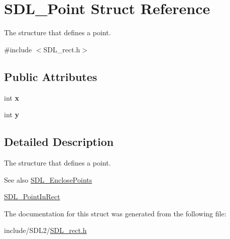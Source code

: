 \hypertarget{struct_s_d_l___point}{}\section{S\+D\+L\+\_\+\+Point Struct Reference}
\label{struct_s_d_l___point}


The structure that defines a point.  




{\ttfamily \#include $<$S\+D\+L\+\_\+rect.\+h$>$}

\subsection*{Public Attributes}
\begin{DoxyCompactItemize}
\item 
\mbox{\label{struct_s_d_l___point_a2ee987d59888024771c8d83aec43056c}} 
int {\bfseries x}
\item 
\mbox{\label{struct_s_d_l___point_aaa68aefa869f6bdf46367a70bd9414b0}} 
int {\bfseries y}
\end{DoxyCompactItemize}


\subsection{Detailed Description}
The structure that defines a point. 

\begin{DoxySeeAlso}{See also}
\hyperlink{_s_d_l__rect_8h_afcbb58dbba760b9e6fdb4b5d1ece015c}{S\+D\+L\+\_\+\+Enclose\+Points} 

\hyperlink{_s_d_l__rect_8h_a2f9708f2739ef234c34e6feda50b4d2c}{S\+D\+L\+\_\+\+Point\+In\+Rect} 
\end{DoxySeeAlso}


The documentation for this struct was generated from the following file\+:\begin{DoxyCompactItemize}
\item 
include/\+S\+D\+L2/\hyperlink{_s_d_l__rect_8h}{S\+D\+L\+\_\+rect.\+h}\end{DoxyCompactItemize}
